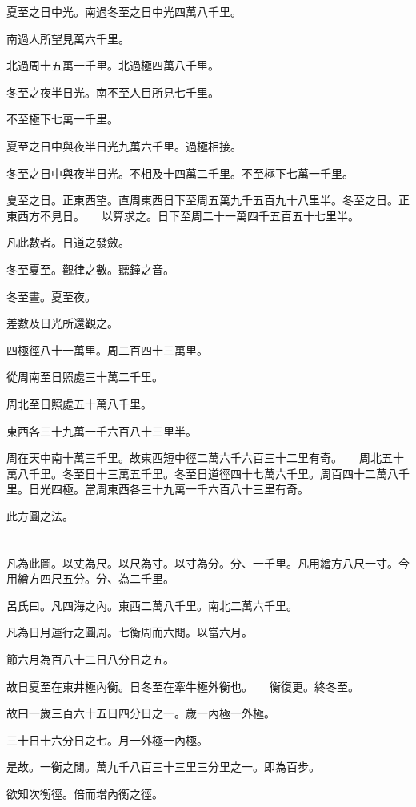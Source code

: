 \documentclass[a4paper,12pt,UTF8,twoside]{ctexbook}
\begin{document}
夏至之日中光。南過冬至之日中光四萬八千里。

南過人所望見萬六千里。

北過周十五萬一千里。北過極四萬八千里。

冬至之夜半日光。南不至人目所見七千里。

不至極下七萬一千里。

夏至之日中與夜半日光九萬六千里。過極相接。

冬至之日中與夜半日光。不相及十四萬二千里。不至極下七萬一千里。

夏至之日。正東西望。直周東西日下至周五萬九千五百九十八里半。冬至之日。正東西方不見日。　　以算求之。日下至周二十一萬四千五百五十七里半。

凡此數者。日道之發斂。

冬至夏至。觀律之數。聽鐘之音。

冬至晝。夏至夜。

差數及日光所還觀之。

四極徑八十一萬里。周二百四十三萬里。

從周南至日照處三十萬二千里。

周北至日照處五十萬八千里。

東西各三十九萬一千六百八十三里半。

周在天中南十萬三千里。故東西短中徑二萬六千六百三十二里有奇。　　周北五十萬八千里。冬至日十三萬五千里。冬至日道徑四十七萬六千里。周百四十二萬八千里。日光四極。當周東西各三十九萬一千六百八十三里有奇。

此方圓之法。

\chapter{}

凡為此圖。以丈為尺。以尺為寸。以寸為分。分、一千里。凡用繒方八尺一寸。今用繒方四尺五分。分、為二千里。

呂氏曰。凡四海之內。東西二萬八千里。南北二萬六千里。

凡為日月運行之圓周。七衡周而六閒。以當六月。

節六月為百八十二日八分日之五。

故日夏至在東井極內衡。日冬至在牽牛極外衡也。　　衡復更。終冬至。

故曰一歲三百六十五日四分日之一。歲一內極一外極。

三十日十六分日之七。月一外極一內極。

是故。一衡之閒。萬九千八百三十三里三分里之一。即為百步。

欲知次衡徑。倍而增內衡之徑。
\end{document}
